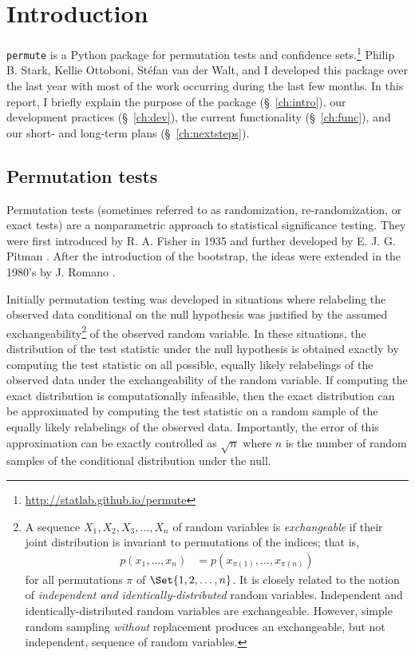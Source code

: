\chapter{\label{ch:intro}Introduction}

\texttt{permute} is a Python package for permutation tests and confidence
sets.\footnote{\url{http://statlab.github.io/permute}} Philip B. Stark, Kellie
Ottoboni, St\'{e}fan van der Walt, and I developed this package over the last
year with most of the work occurring during the last few months.  In this
report, I briefly explain the purpose of the package (\S~\ref{ch:intro}), our
development practices (\S~\ref{ch:dev}), the current functionality
(\S~\ref{ch:func}), and our short- and long-term plans (\S~\ref{ch:nextsteps}).

\section{Permutation tests}

Permutation tests (sometimes referred to as randomization, re-randomization, or
exact tests) are a nonparametric approach to statistical significance testing.
They were first introduced by R. A. Fisher in 1935 \cite{fisher1935design} and
further developed by E. J. G. Pitman  \cite{pitman1937,
pitman1938significance}.  After the introduction of the bootstrap, the ideas
were extended in the 1980's by J. Romano \cite{romano1988bootstrap,
romano1989bootstrap}.

Initially permutation testing was developed in situations where relabeling the
observed data conditional on the null hypothesis was justified by the assumed
exchangeability\footnote{A sequence $X_1, X_2, X_3, \dots, X_n$ of random
variables is \emph{exchangeable} if their joint distribution is invariant to
permutations of the indices; that is,
\begin{align*}
p(x_1, \dots, x_n) &= p(x_{\pi(1)}, \dots, x_{\pi(n)})
\end{align*}
for all permutations $\pi$ of $\Set{1, 2, \dots, n}$.  It is closely related to the
notion of \emph{independent and identically-distributed} random variables.
Independent and identically-distributed random variables are exchangeable.
However, simple random sampling \emph{without} replacement produces an
exchangeable, but not independent, sequence of random variables.}
of the observed random variable.  In these situations, the
distribution of the test statistic under the null hypothesis is obtained
exactly by computing the test statistic on all possible, equally likely
relabelings of the observed data under the exchangeability of the random
variable. If computing the exact distribution is computationally infeasible,
then the exact distribution can be approximated by computing
the test statistic on a random sample of the equally likely relabelings of the
observed data.  Importantly, the error of this approximation can be
exactly controlled as $\sqrt{n}$ where $n$ is the number of random samples
of the conditional distribution under the null.

